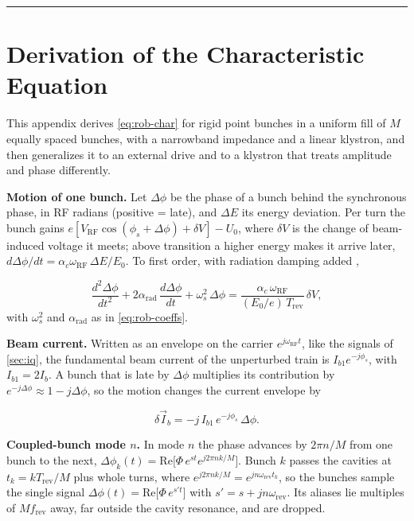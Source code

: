 \begin{center}\rule{0.5\linewidth}{0.5pt}\end{center}

\section{Derivation of the Characteristic Equation}\label{app:char-eq}

This appendix derives \cref{eq:rob-char} for rigid point bunches in a uniform fill of \(M\) equally spaced bunches, with a narrowband impedance and a linear klystron, and then generalizes it to an external drive and to a klystron that treats amplitude and phase differently.

\textbf{Motion of one bunch.} Let \(\Delta\phi\) be the phase of a bunch behind the synchronous phase, in RF radians (positive = late), and \(\Delta E\) its energy deviation. Per turn the bunch gains \(e[V_\text{RF}\cos(\phi_s + \Delta\phi) + \delta V] - U_0\), where \(\delta V\) is the change of beam-induced voltage it meets; above transition a higher energy makes it arrive later, \(d\Delta\phi/dt = \alpha_c\omega_\text{RF}\,\Delta E/E_0\). To first order, with radiation damping added ,

\begin{equation}\label{eq:app-motion}
\frac{d^2\Delta\phi}{dt^2} + 2\alpha_\text{rad}\,\frac{d\Delta\phi}{dt} + \omega_s^2\,\Delta\phi = \frac{\alpha_c\,\omega_\text{RF}}{(E_0/e)\,T_\text{rev}}\,\delta V,
\end{equation}
with \(\omega_s^2\) and \(\alpha_\text{rad}\) as in \cref{eq:rob-coeffs}.

\textbf{Beam current.} Written as an envelope on the carrier \(e^{j\omega_\text{RF}t}\), like the signals of \cref{sec:iq}, the fundamental beam current of the unperturbed train is \(I_{b1}e^{-j\phi_s}\), with \(I_{b1} = 2I_b\). A bunch that is late by \(\Delta\phi\) multiplies its contribution by \(e^{-j\Delta\phi} \approx 1 - j\Delta\phi\), so the motion changes the current envelope by

\begin{equation}\label{eq:app-current}
\delta\vec{I}_b = -j\,I_{b1}\,e^{-j\phi_s}\,\Delta\phi .
\end{equation}

\textbf{Coupled-bunch mode \(n\).} In mode \(n\) the phase advances by \(2\pi n/M\) from one bunch to the next, \(\Delta\phi_k(t) = \text{Re}\bigl[\Phi\,e^{st}e^{j2\pi nk/M}\bigr]\). Bunch \(k\) passes the cavities at \(t_k = kT_\text{rev}/M\) plus whole turns, where \(e^{j2\pi nk/M} = e^{jn\omega_\text{rev}t_k}\), so the bunches sample the single signal \(\Delta\phi(t) = \text{Re}\bigl[\Phi\,e^{s't}\bigr]\) with \(s' = s + jn\omega_\text{rev}\). Its aliases lie multiples of \(Mf_\text{rev}\) away, far outside the cavity resonance, and are dropped.

